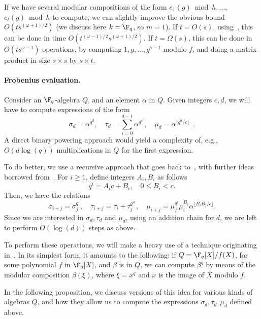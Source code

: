 \begin{note}\label{note:multimc}
If we have several modular compositions of the form $e_1(g) \bmod
h,\dots,$ $e_t(g) \bmod h$ to compute, we can slightly improve the obvious
bound $O(ts^{(\omega+1)/2})$ (we discuss here $k=\F_q$, so $m=1$). If
$t=O(s)$, using~\cite[Lemma~4]{kaltofen+shoup98}, this can be done in
time $O(t^{(\omega-1)/2}s^{(\omega+1)/2})$. If $t=\Omega(s)$, this can
be done in $O(t s^{\omega-1})$ operations, by computing $1,g,\dots,g^{s-1}$
modulo $f$, and doing a matrix product in size $s \times s$ by
$s \times t$.
\end{note}

\paragraph{\bf Frobenius evaluation.} Consider an $\F_q$-algebra $Q$,
and an element $\alpha$ in $Q$. Given integers $c,d$, we will have to
compute expressions of the form
\[
\sigma_d= \alpha^{q^d}, \quad \tau_d = \sum_{i=0}^{d-1} \alpha^{q^{ci}}, \quad
\mu_d=\alpha^{\lfloor q^d/c\rfloor} \enspace .
\]
A direct binary powering approach
would yield a complexity of, e.g., $O(d\log(q))$ multiplications in $Q$
for the first expression.

To do better, we use a recursive approach that goes back
to~\cite{vzgathen+shoup92:journal}, with further ideas borrowed from~\cite{shoup94,kaltofen+shoup97}.
For $i \ge 1$, define integers $A_i, B_i$ as follows
\begin{equation*}
  q^i = A_ic + B_i, \quad 0\le B_i < c.
\end{equation*}
Then, we have the relations
$$\sigma_{i+j}=\sigma_j^{q^i}, \quad \tau_{i+j}=\tau_i +
\tau_j^{q^{ic}}, \quad \mu_{i+j}=\mu_j^{q^i}
\mu_i^{B_j}\alpha^{\lfloor B_iB_j / c \rfloor}.$$ Since we are
interested in $\sigma_d,\tau_d$ and $\mu_d$, using an addition chain
for $d$, we are left to perform $O(\log(d))$ steps as above.

To perform these operations, we will make a heavy use of a technique
originating in~\cite{vzgathen+shoup92:journal}. In its simplest form, it
amounts to the following: if $Q=\F_q[X]/f(X)$, for some polynomial $f$
in $\F_q[X]$, and $\beta$ is in $Q$, we can compute $\beta^{q}$ by
means of the modular composition $\beta(\xi)$, where $\xi = x^{q}$ and
$x$ is the image of $X$ modulo $f$.

In the following proposition, we discuss
versions of this idea for various kinds of algebras $Q$, and how they
allow us to compute the expressions $\sigma_d, \tau_d, \mu_d$ defined
above.

